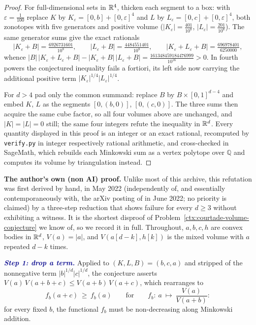 \begin{cxrefutation}
\begin{proof}
For full-dimensional sets in $\mathbb R^4$, thicken each segment to a box: with
$\varepsilon=\tfrac1{100}$ replace $K$ by
$K_\varepsilon=[0,b]+[0,\varepsilon]^4$ and $L$ by
$L_\varepsilon=[0,c]+[0,\varepsilon]^4$, both zonotopes with five generators
and positive volume ($|K_\varepsilon|=\tfrac{401}{10^8}$,
$|L_\varepsilon|=\tfrac{201}{10^8}$).  The same generator sums give the exact
rationals
\[
|K_\varepsilon+B|=\tfrac{6926731601}{10^8},\qquad
|L_\varepsilon+B|=\tfrac{4484551401}{10^8},\qquad
|K_\varepsilon+L_\varepsilon+B|=\tfrac{696978401}{6250000},
\]
whence
$|B|\,|K_\varepsilon+L_\varepsilon+B|-|K_\varepsilon+B|\,|L_\varepsilon+B|
=\tfrac{161348459184476999}{10^{16}}>0$.  In fourth powers the conjectured
inequality fails a fortiori, its left side now carrying the additional
positive term $|K_\varepsilon|^{1/4}|L_\varepsilon|^{1/4}$.

For $d>4$ pad only the common summand: replace $B$ by
$B\times[0,1]^{d-4}$ and embed $K$, $L$ as the segments
$[0,(b,0)]$, $[0,(c,0)]$.  The three sums then acquire the same cube factor,
so all four volumes above are unchanged, and $|K|=|L|=0$ still; the same four
integers refute the inequality in $\mathbb R^d$.  Every quantity displayed in this
proof is an integer or an exact rational, recomputed by
\texttt{verify.py} in integer respectively rational arithmetic, and
cross-checked in SageMath, which rebuilds each Minkowski sum as a vertex
polytope over $\mathbb{Q}$ and computes its volume by triangulation instead.
\end{proof}

\noindent\textbf{The author's own (non AI) proof.}
Unlike most of this archive, this refutation was first derived by hand,
in May 2022 (independently of, and essentially contemporaneously with, the
arXiv posting of \citet{FradeliziMadimanZvavitch2024} in June 2022; no priority is claimed) by a three-step reduction that shows failure for every
$d\ge3$ without exhibiting a witness.  It is the shortest disproof of
Problem~\ref{ctx:courtade-volume-conjecture} we know of, so we record it in
full.  Throughout, $a,b,c,h$ are convex bodies in $\mathbb R^d$, $V(a)=|a|$, and
$V(a[d{-}k],h[k])$ is the mixed volume with $a$ repeated $d-k$ times.

\textcolor{darkblue}{\textbf{\emph{Step 1: drop a term.}}}  Applied to $(K,L,B)=(b,c,a)$ and stripped of the
nonnegative term $|b|^{1/d}|c|^{1/d}$, the conjecture asserts
$V(a)\,V(a+b+c)\le V(a+b)\,V(a+c)$, which rearranges to
\[
f_b(a+c)\ \ge\ f_b(a)
\qquad\text{for}\qquad
f_b:\ a\ \longmapsto\ \frac{V(a)}{V(a+b)}:
\]
for every fixed $b$, the functional $f_b$ must be non-decreasing along
Minkowski addition.


\end{cxrefutation}
